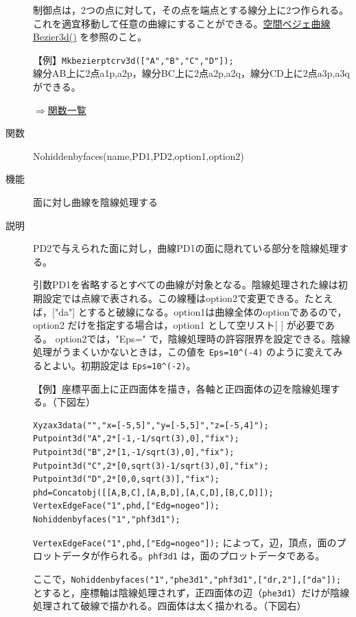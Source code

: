 \documentclass[papersize,a4paper,12pt,uplatex]{jsarticle}
\begin{document}
\begin{description}
  制御点は，2つの点に対して，その点を端点とする線分上に2つ作られる。これを適宜移動して任意の曲線にすることができる。\hyperlink{bezier3d}{空間ベジェ曲線 Bezier3d()} を参照のこと。
  
\vspace{\baselineskip}
【例】\verb|Mkbezierptcrv3d(["A","B","C","D"]);|\\
    線分AB上に2点a1p,a2p，線分BC上に2点a2p,a2q，線分CD上に2点a3p,a3qができる。
    

\begin{flushright} \hyperlink{functionlist}{$\Rightarrow$関数一覧}\end{flushright}

\hypertarget{nohiddenbyfaces}{}
\item[関数]  Nohiddenbyfaces(name,PD1,PD2,option1,option2)
\item[機能]  面に対し曲線を陰線処理する
\item[説明]  PD2で与えられた面に対し，曲線PD1の面に隠れている部分を陰線処理する。

引数PD1を省略するとすべての曲線が対象となる。陰線処理された線は初期設定では点線で表される。この線種はoption2で変更できる。たとえば，["da"] とすると破線になる。option1は曲線全体のoptionであるので，option2 だけを指定する場合は，option1 として空リスト[ ] が必要である。
option2では，"Eps=" で，陰線処理時の許容限界を設定できる。陰線処理がうまくいかないときは，この値を \verb|Eps=10^(-4)| のように変えてみるとよい。初期設定は \verb|Eps=10^(-2)|。

\vspace{\baselineskip}
【例】座標平面上に正四面体を描き，各軸と正四面体の辺を陰線処理する。（下図左）
\begin{verbatim}
Xyzax3data("","x=[-5,5]","y=[-5,5]","z=[-5,4]");
Putpoint3d("A",2*[-1,-1/sqrt(3),0],"fix");
Putpoint3d("B",2*[1,-1/sqrt(3),0],"fix");
Putpoint3d("C",2*[0,sqrt(3)-1/sqrt(3),0],"fix");
Putpoint3d("D",2*[0,0,sqrt(3)],"fix");
phd=Concatobj([[A,B,C],[A,B,D],[A,C,D],[B,C,D]]);
VertexEdgeFace("1",phd,["Edg=nogeo"]);
Nohiddenbyfaces("1","phf3d1"); 
\end{verbatim}

  \verb|VertexEdgeFace("1",phd,["Edg=nogeo"]);| によって，辺，頂点，面のプロットデータが作られる。\verb|phf3d1| は，面のプロットデータである。
  
ここで，\verb|Nohiddenbyfaces("1","phe3d1","phf3d1",["dr,2"],["da"]); | とすると，座標軸は陰線処理されず，正四面体の辺（\verb|phe3d1|）だけが陰線処理されて破線で描かれる。四面体は太く描かれる。（下図右）
  

\end{description}
\end{document}
